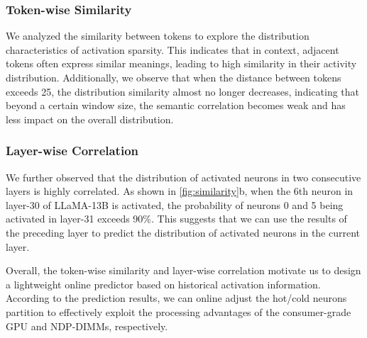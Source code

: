 \subsubsection{Token-wise Similarity}
We analyzed the similarity between tokens to explore the distribution characteristics of activation sparsity.  This indicates that in context, adjacent tokens often express similar meanings, leading to high similarity in their activity distribution. Additionally, we observe that when the distance between tokens exceeds 25, the distribution similarity almost no longer decreases, indicating that beyond a certain window size, the semantic correlation becomes weak and has less impact on the overall distribution.

\subsubsection{Layer-wise Correlation} 
We further observed that the distribution of activated neurons in two consecutive layers is highly correlated. As shown in \fig \ref{fig:similarity}b, when the 6th neuron in layer-30 of LLaMA-13B is activated, the probability of neurons 0 and 5 being activated in layer-31 exceeds 90\%. This suggests that we can use the results of the preceding layer to predict the distribution of activated neurons in the current layer.

Overall, the token-wise similarity and layer-wise correlation motivate us to design a lightweight online predictor based on historical activation information. According to the prediction results, we can online adjust the hot/cold neurons partition to effectively exploit the processing advantages of the consumer-grade GPU and NDP-DIMMs, respectively.

